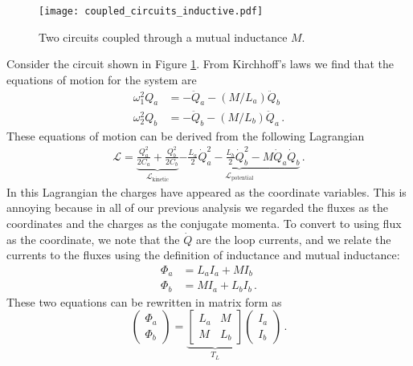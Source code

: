 
\begin{figure}
\begin{centering}
\texttt{[image: coupled\_circuits\_inductive.pdf]}
\par\end{centering}
\caption{Two circuits coupled through a mutual inductance $M$.}
\label{Fig:coupledCircuits_inductive}
\end{figure}

Consider the circuit shown in Figure \ref{Fig:coupledCircuits_inductive}.
From Kirchhoff's laws we find that the equations of motion for the system are
\begin{align*}
  \omega_1^2 Q_a &= -\ddot{Q}_a - \left(M/L_a\right) \ddot{Q}_b \\
  \omega_2^2 Q_b &= -\ddot{Q}_b - \left(M/L_b\right) \ddot{Q}_a
  \, .
\end{align*}
These equations of motion can be derived from the following Lagrangian
\begin{align*}
  \mathcal{L} =
  \underbrace{
      \frac{Q_a^2}{2 C_a} + \frac{Q_b^2}{2 C_b}
  }_{\mathcal{L}_\text{kinetic}}
  \underbrace{
    - \frac{L_a}{2}\dot{Q}_a^2
    - \frac{L_b}{2}\dot{Q}_b^2
    - M \dot{Q}_a \dot{Q}_b
  }_{\mathcal{L}_\text{potential}}
  \, . \label{eq:sec.coupling.subsec.inductiveCoupling:Lagrangian}
\end{align*}
In this Lagrangian the charges have appeared as the coordinate variables.
This is annoying because in all of our previous analysis we regarded the fluxes as the coordinates and the charges as the conjugate momenta.
To convert to using flux as the coordinate, we note that the $\dot{Q}$ are the loop currents, and we relate the currents to the fluxes using the definition of inductance and mutual inductance:
\begin{align*}
  \Phi_a &= L_a I_a + M I_b \\
  \Phi_b &= M I_a + L_b I_b \, .
\end{align*}
These two equations can be rewritten in matrix form as
\begin{equation*}
  \left( \begin{array}{c} \Phi_a \\ \Phi_b \end{array} \right)
  =
  \underbrace{
    \left[ \begin{array}{cc} L_a & M \\ M & L_b \end{array} \right]
  }_{T_L}
  \left( \begin{array}{c} I_a \\ I_b \end{array} \right) \, . \label{eq:sec.coupling.subsec.inductiveCoupling:fluxToI}
\end{equation*}
